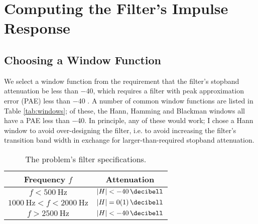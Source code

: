 





\newpage
\tableofcontents
\newpage

\section{Computing the Filter's Impulse Response}

\subsection{Choosing a Window Function}

We select a window function from the requirement that the filter's stopband attenuation be less than \SI{-40}{\decibell}, which requires a filter with peak approximation error (PAE) less than \SI{-40}{\decibell} \cite{introdsp, proakis}.
A number of common window functions are listed in Table \ref{tab:windows}; of these, the Hann, Hamming and Blackman windows all have a PAE less than \SI{-40}{\decibell}. In principle, any of these would work; I chose a Hann window to avoid over-designing the filter, i.e. to avoid increasing the filter's transition band width in exchange for larger-than-required stopband attenuation.

\begin{table}[htb!]
    \centering
    \begin{tabular}{|c|c|}
        \hline
        Frequency $ f $ & Attenuation \\
        \hline
        \hline
        $ f < \SI{500}{\hertz} $ & $ \abs{H} < \SI{-40}{\decibell} $ \\
        $ \SI{1000}{\hertz} < f < \SI{2000}{\hertz} $ & $ \abs{H} = \SI{0 \pm 1}{\decibell} $ \\
        $ f > \SI{2500}{\hertz} $ & $ \abs{H} < \SI{-40}{\decibell} $ \\
        \hline
    \end{tabular}
    \caption{The problem's filter specifications.}
    \label{tab:specs}
\end{table}

